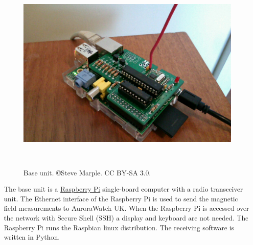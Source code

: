 \begin{figure}
  \centering
  \includegraphics[keepaspectratio,height=10cm]{images/base-unit}
  \caption[Base unit]%
  {Base unit. \small{\copyright Steve Marple. CC BY-SA 3.0.}}
  \label{fig:base-unit}
\end{figure}

The base unit is a \href{http://www.raspberrypi.org/‎}{Raspberry Pi}
single-board computer with a radio transceiver unit. The Ethernet
interface of the Raspberry Pi is used to send the magnetic field
measurements to AuroraWatch UK. When the Raspberry Pi is accessed over
the network with Secure Shell (SSH) a display and keyboard are not
needed. The Raspberry Pi runs the Raspbian linux distribution. The
receiving software is written in Python.

